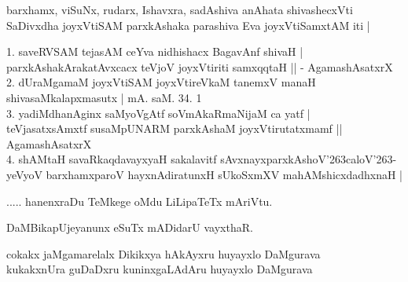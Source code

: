 \begin{entry}
\gl{}
\info{}{}{}{}
\begin{shl}
barxhamx, viSuNx, rudarx, Ishavxra, sadAshiva anAhata shivashecxVti\\
SaDivxdha joyxVtiSAM parxkAshaka parashiva Eva joyxVtiSamxtAM iti |
\end{shl}
\begin{shl}
1. saveRVSAM tejasAM ceYva nidhishacx BagavAnf shivaH |\\
parxkAshakArakatAvxcacx teVjoV joyxVtiriti samxqqtaH || - AgamashAsatxrX\\
2. dUraMgamaM joyxVtiSAM joyxVtireVkaM tanemxV manaH shivasaMkalapxmasutx | mA. saM. 34. 1\\
3. yadiMdhanAginx saMyoVgAtf soVmAkaRmaNijaM ca yatf |\\
teVjasatxsAmxtf susaMpUNARM parxkAshaM joyxVtirutatxmamf || AgamashAsatxrX\\
4. shAMtaH savaRkaqdavayxyaH sakalavitf sAvxnayxparxkAshoV\char'263caloV\char'263-\\
yeVyoV barxhamxparoV hayxnAdiratunxH sUkoSxmXV mahAMshicxdadhxnaH |
\end{shl}
\end{entry}

\begin{entry}
\begin{shl}
..... hanenxraDu TeMkege oMdu LiLipaTeTx mAriVtu.
\end{shl}
\end{entry}

\begin{entry}
\gl{}
\begin{shl}
DaMBikapUjeyanunx eSuTx mADidarU vayxthaR.
\end{shl}
\end{entry}

\begin{entry}
\begin{shl}
cokakx jaMgamarelalx Dikikxya hAkAyxru huyayxlo DaMgurava\\
kukakxnUra guDaDxru kuninxgaLAdAru huyayxlo DaMgurava
\end{shl}
\end{entry}
